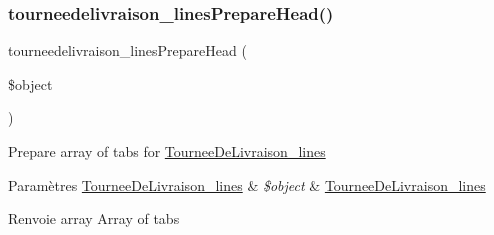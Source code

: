 \subsubsection{\texorpdfstring{tourneedelivraison\+\_\+lines\+Prepare\+Head()}{tourneedelivraison\_linesPrepareHead()}}
{\footnotesize\ttfamily tourneedelivraison\+\_\+lines\+Prepare\+Head (\begin{DoxyParamCaption}\item[{}]{\$object }\end{DoxyParamCaption})}

Prepare array of tabs for \hyperlink{classTourneeDeLivraison__lines}{Tournee\+De\+Livraison\+\_\+lines}


\begin{DoxyParams}[1]{Paramètres}
\hyperlink{classTourneeDeLivraison__lines}{Tournee\+De\+Livraison\+\_\+lines} & {\em \$object} & \hyperlink{classTourneeDeLivraison__lines}{Tournee\+De\+Livraison\+\_\+lines} \\
\hline
\end{DoxyParams}
\begin{DoxyReturn}{Renvoie}
array Array of tabs 
\end{DoxyReturn}
